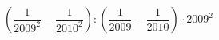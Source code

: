 \begin{ex}[type=calculate]
	\begin{condition}
		\( \left( \dfrac{1}{2009^2}-\dfrac{1}{2010^2} \right):\left( \dfrac{1}{2009}-\dfrac{1}{2010} \right)\cdot2009^2 \)
	\end{condition}
\end{ex}